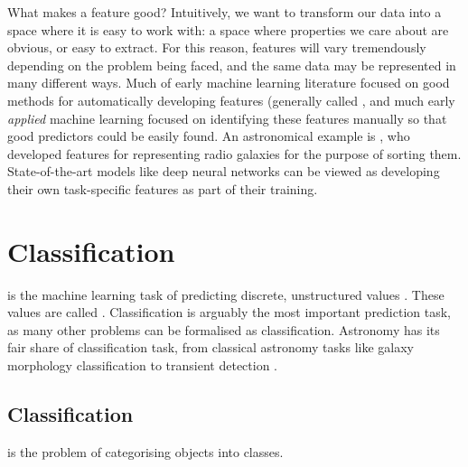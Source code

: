     What makes a feature good? Intuitively, we want to transform our data into a space where it is easy to work with: a space where properties we care about are obvious, or easy to extract. For this reason, features will vary tremendously depending on the problem being faced, and the same data may be represented in many different ways. Much of early machine learning literature focused on good methods for automatically developing features (generally called , and much early \emph{applied} machine learning focused on identifying these features manually so that good predictors could be easily found. An astronomical example is \citet{proctor06}, who developed features for representing radio galaxies for the purpose of sorting them. State-of-the-art models like deep neural networks \citep[e.g.][]{dieleman15cnn} can be viewed as developing their own task-specific features as part of their training.

\section{Classification}
    
     is the machine learning task of predicting discrete, unstructured values \citep{deisenroth_mathematics_2020}. These values are called . Classification is arguably the most important prediction task, as many other problems can be formalised as classification. Astronomy has its fair share of classification task, from classical astronomy tasks like galaxy morphology classification \citep[appearing in machine learning literature as e.g.][]{dieleman15cnn} to transient detection \citeneeded.
    \subsection{Classification}
    \label{sec:classification}

     is the problem of categorising objects into classes. 